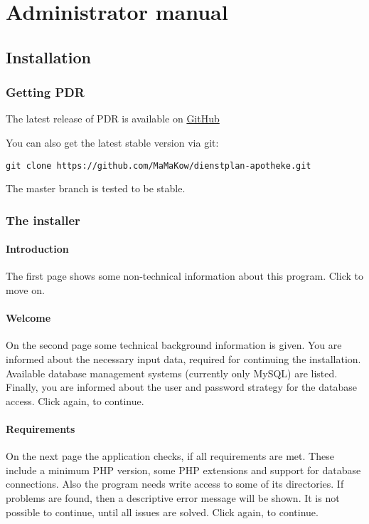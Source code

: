 \chapter{Administrator manual}
\section{Installation}\label{sec:installation}
\subsection{Getting PDR}
The latest release of PDR is available on \href{https://github.com/MaMaKow/dienstplan-apotheke/releases}{GitHub}

You can also get the latest stable version via git:
\begin{verbatim}
git clone https://github.com/MaMaKow/dienstplan-apotheke.git
\end{verbatim}
The master branch is tested to be stable.
\subsection{The installer}
\subsubsection{Introduction}
The first page shows some non-technical information about this program. Click  to move on.
\subsubsection{Welcome}
On the second page some technical background information is given. You are informed about the necessary input data, required for continuing the installation. Available database management systems (currently only MySQL) are listed. Finally, you are informed about the user and password strategy for the database access. Click  again, to continue.
\subsubsection{Requirements}
On the next page the application checks, if all requirements are met. These include a minimum PHP version, some PHP extensions and support for database connections. Also the program needs write access to some of its directories.
If problems are found, then a descriptive error message will be shown. It is not possible to continue, until all issues are solved.
Click  again, to continue.
